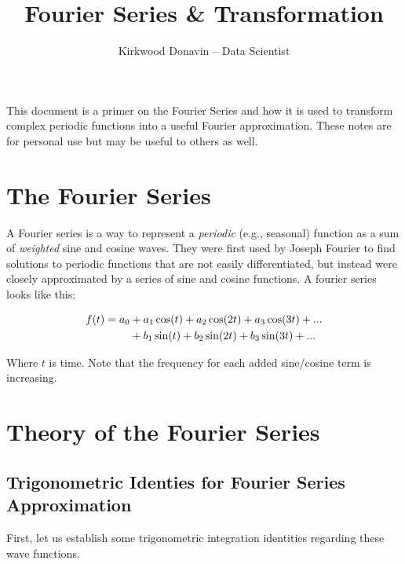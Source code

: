\documentclass[10pt]{article} %
\title{Fourier Series \& Transformation}
\author{Kirkwood Donavin -- Data Scientist}
\date{} %
\begin{document}
\maketitle

\tableofcontents
\vspace{1cm}

This document is a primer on the Fourier Series and how it is used to transform complex periodic functions into a useful Fourier approximation. These notes are for personal use but may be useful to others as well.

\section{The Fourier Series}

A Fourier series is a way to represent a \textit{periodic} (e.g., seasonal) function as a sum of \textit{weighted} sine and cosine waves. They were first used by Joseph Fourier to find solutions to periodic functions that are not easily differentiated, but instead were closely approximated by a series of sine and cosine functions. A fourier series looks like this:

\begin{align}
f(t) = a_0 & + a_1\cos(t) + a_2\cos(2t) + a_3\cos(3t) + ... \\
           & + b_1\sin(t) + b_2\sin(2t) + b_3\sin(3t) + ... \notag
\end{align}

Where $t$ is time. Note that the frequency for each added sine/cosine term is increasing.

\section{Theory of the Fourier Series}

\subsection{Trigonometric Identies for Fourier Series Approximation}

First, let us establish some trigonometric integration identities regarding these wave functions.
\end{document}
